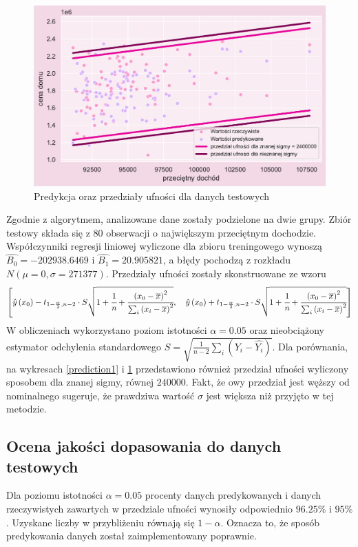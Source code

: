 \documentclass{article}
\begin{document}
    \begin{figure}[H]
	\begin{center}
		\includegraphics[scale=0.68]{images/predykcja_zoom.pdf}
		\caption{Predykcja oraz przedziały ufności dla danych testowych}
		\label{prediction2}
	\end{center}
	\end{figure}

\noindent Zgodnie z algorytmem, analizowane dane zostały podzielone na dwie grupy. Zbiór testowy składa się z 80 obserwacji o największym przeciętnym dochodzie. Współczynniki regresji liniowej wyliczone dla zbioru treningowego wynoszą $\hat{B_0}=-202938.6469$ i $\hat{B_1}=20.905821$, a błędy pochodzą z rozkładu $N(\mu=0,\sigma=271377)$. Przedziały ufności zostały skonstruowane ze wzoru 
$$\left[\hat{y}\left( x_0 \right) - t_{1-\frac{\alpha}{2},n-2} \cdot S \sqrt{ 1+\cfrac{1}{n} + \cfrac{ {\left( x_0 - \overline{x} \right) }^2}{\sum_i {\left( x_i - \overline{x} \right) }^2}}, 
\quad
\hat{y}\left( x_0 \right) + t_{1-\frac{\alpha}{2},n-2} \cdot S \sqrt{ 1+\cfrac{1}{n} + \cfrac{ {\left( x_0 - \overline{x} \right) }^2}{\sum_i {\left( x_i - \overline{x} \right) }^2}}\right]$$
W obliczeniach wykorzystano poziom istotności $\alpha = 0.05$ oraz nieobciążony estymator odchylenia standardowego $S=\sqrt{\frac{1}{n-2} \sum_i \left( Y_i - \hat{Y_i} \right)}$. Dla porównania, na wykresach \ref{prediction1} i \ref{prediction2} przedstawiono również przedział ufności wyliczony sposobem dla znanej sigmy, równej $240000$. Fakt, że owy przedział jest węższy od nominalnego sugeruje, że prawdziwa wartość $\sigma$ jest większa niż przyjęto w tej metodzie. \\


\subsection{Ocena jakości dopasowania do danych testowych}
Dla poziomu istotności $\alpha = 0.05$ procenty danych predykowanych i danych rzeczywistych zawartych w przedziale ufności wynosiły odpowiednio
$96.25\%$ i $95\%$. Uzyskane liczby w przybliżeniu równają się $1-\alpha$. Oznacza to, że sposób predykowania danych został zaimplementowany poprawnie. \\
\end{document}
